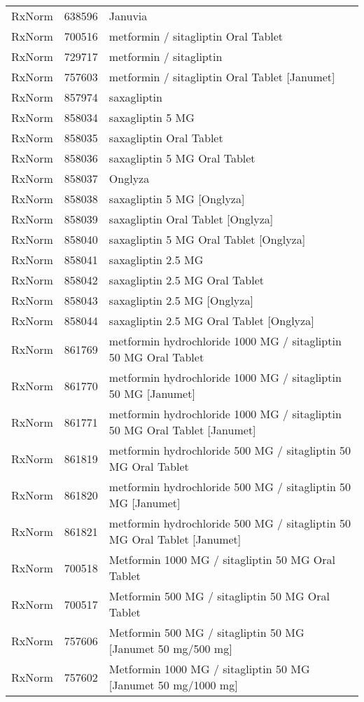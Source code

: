 \begin{longtable}{p{}p{}p{}}
  RxNorm & 638596 & Januvia \\ 
  RxNorm & 700516 & metformin / sitagliptin Oral Tablet \\ 
  RxNorm & 729717 & metformin / sitagliptin \\ 
  RxNorm & 757603 & metformin / sitagliptin Oral Tablet [Janumet] \\ 
  RxNorm & 857974 & saxagliptin \\ 
  RxNorm & 858034 & saxagliptin 5 MG \\ 
  RxNorm & 858035 & saxagliptin Oral Tablet \\ 
  RxNorm & 858036 & saxagliptin 5 MG Oral Tablet \\ 
  RxNorm & 858037 & Onglyza \\ 
  RxNorm & 858038 & saxagliptin 5 MG [Onglyza] \\ 
  RxNorm & 858039 & saxagliptin Oral Tablet [Onglyza] \\ 
  RxNorm & 858040 & saxagliptin 5 MG Oral Tablet [Onglyza] \\ 
  RxNorm & 858041 & saxagliptin 2.5 MG \\ 
  RxNorm & 858042 & saxagliptin 2.5 MG Oral Tablet \\ 
  RxNorm & 858043 & saxagliptin 2.5 MG [Onglyza] \\ 
  RxNorm & 858044 & saxagliptin 2.5 MG Oral Tablet [Onglyza] \\ 
  RxNorm & 861769 & metformin hydrochloride 1000 MG / sitagliptin 50 MG Oral Tablet \\ 
  RxNorm & 861770 & metformin hydrochloride 1000 MG / sitagliptin 50 MG [Janumet] \\ 
  RxNorm & 861771 & metformin hydrochloride 1000 MG / sitagliptin 50 MG Oral Tablet [Janumet] \\ 
  RxNorm & 861819 & metformin hydrochloride 500 MG / sitagliptin 50 MG Oral Tablet \\ 
  RxNorm & 861820 & metformin hydrochloride 500 MG / sitagliptin 50 MG [Janumet] \\ 
  RxNorm & 861821 & metformin hydrochloride 500 MG / sitagliptin 50 MG Oral Tablet [Janumet] \\ 
  RxNorm & 700518 & Metformin 1000 MG / sitagliptin 50 MG Oral Tablet \\ 
  RxNorm & 700517 & Metformin 500 MG / sitagliptin 50 MG Oral Tablet \\ 
  RxNorm & 757606 & Metformin 500 MG / sitagliptin 50 MG [Janumet 50 mg/500 mg] \\ 
  RxNorm & 757602 & Metformin 1000 MG / sitagliptin 50 MG [Janumet 50 mg/1000 mg] \\ 

\end{longtable}
